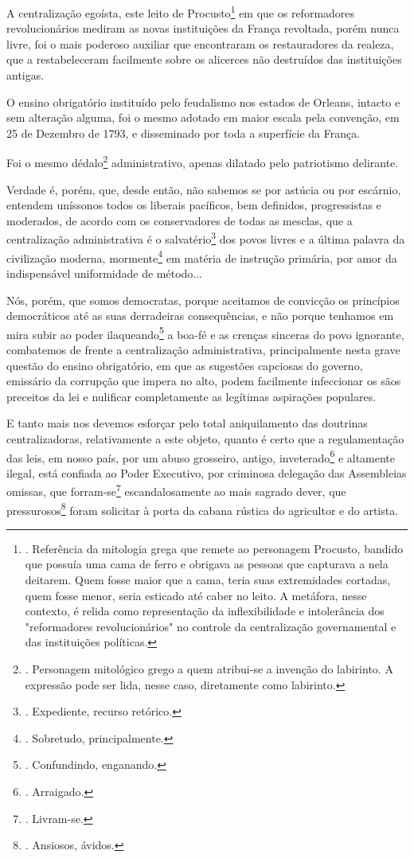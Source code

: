 A centralização egoísta, este leito de Procusto\footnote{. Referência da
  mitologia grega que remete ao personagem Procusto, bandido que possuía
  uma cama de ferro e obrigava as pessoas que capturava a nela deitarem.
  Quem fosse maior que a cama, teria suas extremidades cortadas, quem
  fosse menor, seria esticado até caber no leito. A metáfora, nesse
  contexto, é relida como representação da inflexibilidade e
  intolerância dos "reformadores revolucionários" no controle da
  centralização governamental e das instituições políticas.} em que os
reformadores revolucionários mediram as novas instituições da França
revoltada, porém nunca livre, foi o mais poderoso auxiliar que
encontraram os restauradores da realeza, que a restabeleceram facilmente
sobre os alicerces não destruídos das instituições antigas.

O ensino obrigatório instituído pelo feudalismo nos estados de Orleans,
intacto e sem alteração alguma, foi o mesmo adotado em maior escala pela
convenção, em 25 de Dezembro de 1793, e disseminado por toda a
superfície da França.

Foi o mesmo dédalo\footnote{. Personagem mitológico grego a quem
  atribui-se a invenção do labirinto. A expressão pode ser lida, nesse
  caso, diretamente como labirinto.} administrativo, apenas dilatado
pelo patriotismo delirante.

Verdade é, porém, que, desde então, não sabemos se por astúcia ou por
escárnio, entendem uníssonos todos os liberais pacíficos, bem definidos,
progressistas e moderados, de acordo com os conservadores de todas as
mesclas, que a centralização administrativa é o salvatério\footnote{.
  Expediente, recurso retórico.} dos povos livres e a última palavra da
civilização moderna, mormente\footnote{. Sobretudo, principalmente.} em
matéria de instrução primária, por amor da indispensável uniformidade de
método...

Nós, porém, que somos democratas, porque aceitamos de convicção os
princípios democráticos até as suas derradeiras consequências, e não
porque tenhamos em mira subir ao poder ilaqueando\footnote{.
  Confundindo, enganando.} a boa-fé e as crenças sinceras do povo
ignorante, combatemos de frente a centralização administrativa,
principalmente nesta grave questão do ensino obrigatório, em que as
sugestões capciosas do governo, emissário da corrupção que impera no
alto, podem facilmente infeccionar os sãos preceitos da lei e nulificar
completamente as legítimas aspirações populares.

E tanto mais nos devemos esforçar pelo total aniquilamento das doutrinas
centralizadoras, relativamente a este objeto, quanto é certo que a
regulamentação das leis, em nosso país, por um abuso grosseiro, antigo,
inveterado\footnote{. Arraigado.} e altamente ilegal, está confiada ao
Poder Executivo, por criminosa delegação das Assembleias omissas, que
forram-se\footnote{. Livram-se.} escandalosamente ao mais sagrado dever,
que pressurosos\footnote{. Ansiosos, ávidos.} foram solicitar à porta da
cabana rústica do agricultor e do artista.

